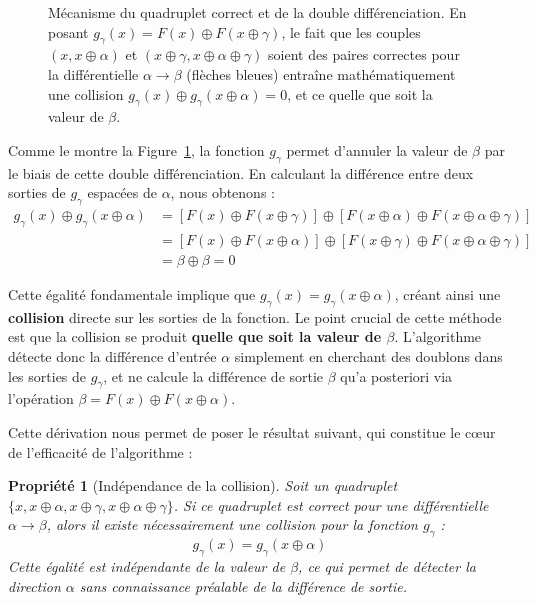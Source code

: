 \documentclass[a4paper,11pt]{article}
\newtheorem{prop}{Propriété}
\begin{document}
\begin{figure}[htbp]
    \centering
    \resizebox{\textwidth}{!}{}
    \caption{Mécanisme du quadruplet correct et de la double différenciation. En posant $g_{\gamma}(x) = F(x) \oplus F(x \oplus \gamma)$, le fait que les couples $(x, x \oplus \alpha)$ et $(x \oplus \gamma, x \oplus \alpha \oplus \gamma)$ soient des paires correctes pour la différentielle $\alpha \rightarrow \beta$ (flèches bleues) entraîne mathématiquement une collision $g_{\gamma}(x) \oplus g_{\gamma}(x \oplus \alpha) = 0$, et ce quelle que soit la valeur de $\beta$.}
    \label{fig:right_quartet}
\end{figure}

Comme le montre la Figure~\ref{fig:right_quartet}, la fonction $g_{\gamma}$ permet d'annuler la valeur de $\beta$ par le biais de cette double différenciation. En calculant la différence entre deux sorties de $g_{\gamma}$ espacées de $\alpha$, nous obtenons :
\begin{align*}
    g_{\gamma}(x) \oplus g_{\gamma}(x \oplus \alpha) &= \left[ F(x) \oplus F(x \oplus \gamma) \right] \oplus \left[ F(x \oplus \alpha) \oplus F(x \oplus \alpha \oplus \gamma) \right] \\
    &= \left[ F(x) \oplus F(x \oplus \alpha) \right] \oplus \left[ F(x \oplus \gamma) \oplus F(x \oplus \alpha \oplus \gamma) \right] \\
    &= \beta \oplus \beta = 0
\end{align*}

Cette égalité fondamentale implique que $g_{\gamma}(x) = g_{\gamma}(x \oplus \alpha)$, créant ainsi une \textbf{collision} directe sur les sorties de la fonction. Le point crucial de cette méthode est que la collision se produit \textbf{quelle que soit la valeur de $\beta$}. L'algorithme détecte donc la différence d'entrée $\alpha$ simplement en cherchant des doublons dans les sorties de $g_{\gamma}$, et ne calcule la différence de sortie $\beta$ qu'a posteriori via l'opération $\beta = F(x) \oplus F(x \oplus \alpha)$.

Cette dérivation nous permet de poser le résultat suivant, qui constitue le cœur de l'efficacité de l'algorithme :

\begin{prop}[Indépendance de la collision]
Soit un quadruplet $\{x, x \oplus \alpha, x \oplus \gamma, x \oplus \alpha \oplus \gamma\}$. Si ce quadruplet est correct pour une différentielle $\alpha \rightarrow \beta$, alors il existe nécessairement une collision pour la fonction $g_\gamma$ :
\begin{equation*}
    g_{\gamma}(x) = g_{\gamma}(x \oplus \alpha)
\end{equation*}
Cette égalité est indépendante de la valeur de $\beta$, ce qui permet de détecter la direction $\alpha$ sans connaissance préalable de la différence de sortie.
\end{prop}
\end{document}
